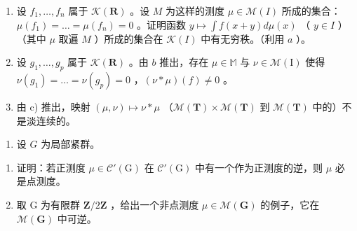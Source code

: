 \begin{enumerate}
\def\labelenumi{\alph{enumi})}
\setcounter{enumi}{1}
\item
  设 \(f_1, \ldots, f_n\) 属于 \(\mathcal{K}(\mathbf{R})\) 。设 \(M\) 为这样的测度 \(\mu \in \mathcal{M}(I)\) 所成的集合：\(\mu(f_1) = \ldots = \mu(f_n) = 0\) 。证明函数 \(y \mapsto \int f(x + y) d\mu(x)\) （ \(y \in I\) ）（其中 \(\mu\) 取遍 \(M\) ）所成的集合在 \(\mathcal{K}(I)\) 中有无穷秩。（利用 \(a\) ）。
\item
  设 \(g_1, \ldots, g_p\) 属于 \(\mathcal{K}(\mathbf{R})\) 。由 \(b\) 推出，存在 \(\mu \in \mathbb{M}\) 与 \(\nu \in \mathcal{M}(\mathrm{I})\) 使得 \(\nu(g_1) = \ldots = \nu(g_p) = 0\) ，\((\nu * \mu)(f) \neq 0\) 。
\item
  由 c) 推出，映射 \((\mu,\nu)\mapsto\nu*\mu\) （\(\mathcal{M}(\mathbf{T})\times\mathcal{M}(\mathbf{T})\) 到 \(\mathcal{M}(\mathbf{T})\) 中的）不是淡连续的。
\end{enumerate}

\begin{enumerate}
\def\labelenumi{\arabic{enumi})}
\setcounter{enumi}{6}
\tightlist
\item
  设 \(G\) 为局部紧群。
\end{enumerate}

\begin{enumerate}
\def\labelenumi{\alph{enumi})}
\item
  证明：若正测度 \(\mu \in \mathcal{C}'(\mathrm{G})\) 在 \(\mathcal{C}'(\mathrm{G})\) 中有一个作为正测度的逆，则 \(\mu\) 必是点测度。
\item
  取 G 为有限群 \(\mathbf{Z}/2\mathbf{Z}\) ，给出一个非点测度 \(\mu \in \mathcal{M}(\mathbf{G})\) 的例子，它在 \(\mathcal{M}(\mathbf{G})\) 中可逆。
\end{enumerate}

